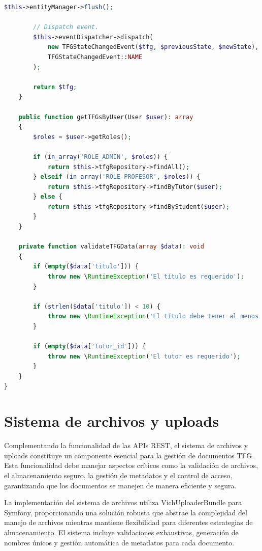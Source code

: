 \documentclass[12pt,a4paper,oneside]{report}
\begin{document}
\begin{lstlisting}[language=PHP]
        $this->entityManager->flush();

        // Dispatch event.
        $this->eventDispatcher->dispatch(
            new TFGStateChangedEvent($tfg, $previousState, $newState),
            TFGStateChangedEvent::NAME
        );

        return $tfg;
    }

    public function getTFGsByUser(User $user): array
    {
        $roles = $user->getRoles();

        if (in_array('ROLE_ADMIN', $roles)) {
            return $this->tfgRepository->findAll();
        } elseif (in_array('ROLE_PROFESOR', $roles)) {
            return $this->tfgRepository->findByTutor($user);
        } else {
            return $this->tfgRepository->findByStudent($user);
        }
    }

    private function validateTFGData(array $data): void
    {
        if (empty($data['titulo'])) {
            throw new \RuntimeException('El título es requerido');
        }

        if (strlen($data['titulo']) < 10) {
            throw new \RuntimeException('El título debe tener al menos 10 caracteres');
        }

        if (empty($data['tutor_id'])) {
            throw new \RuntimeException('El tutor es requerido');
        }
    }
}
\end{lstlisting}

\section{Sistema de archivos y
uploads}\label{sistema-de-archivos-y-uploads}

Complementando la funcionalidad de las APIs REST, el sistema de archivos
y uploads constituye un componente esencial para la gestión de
documentos TFG. Esta funcionalidad debe manejar aspectos críticos como
la validación de archivos, el almacenamiento seguro, la gestión de
metadatos y el control de acceso, garantizando que los documentos se
manejen de manera eficiente y segura.

La implementación del sistema de archivos utiliza VichUploaderBundle
para Symfony, proporcionando una solución robusta que abstrae la
complejidad del manejo de archivos mientras mantiene flexibilidad para
diferentes estrategias de almacenamiento. El sistema incluye
validaciones exhaustivas, generación de nombres únicos y gestión
automática de metadatos para cada documento.
\end{document}
